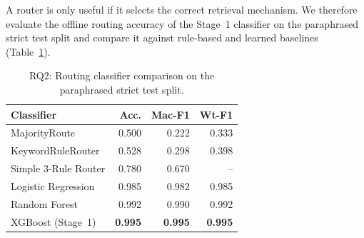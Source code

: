 ﻿\documentclass[11pt,twocolumn]{article}
\begin{document}
A router is only useful if it selects the correct retrieval mechanism. We
therefore evaluate the offline routing accuracy of the Stage~1 classifier
on the paraphrased strict test split and compare it against rule-based and
learned baselines (Table~\ref{tab:routing_baselines}).

\begin{table}[!htbp]
\centering
\caption{RQ2: Routing classifier comparison on the paraphrased strict
test split.}
\label{tab:routing_baselines}
\scriptsize
\setlength{\tabcolsep}{3pt}
\renewcommand{\arraystretch}{1.08}
\begin{tabular}{lrrr}
\toprule
\textbf{Classifier} & \textbf{Acc.} & \textbf{Mac-F1} & \textbf{Wt-F1} \\
\midrule
MajorityRoute & 0.500 & 0.222 & 0.333 \\
KeywordRuleRouter & 0.528 & 0.298 & 0.398 \\
Simple 3-Rule Router & 0.780 & 0.670 & -- \\
Logistic Regression & 0.985 & 0.982 & 0.985 \\
Random Forest & 0.992 & 0.990 & 0.992 \\
XGBoost (Stage~1) & \textbf{0.995} & \textbf{0.995} & \textbf{0.995} \\
\bottomrule
\end{tabular}
\end{table}
\end{document}
